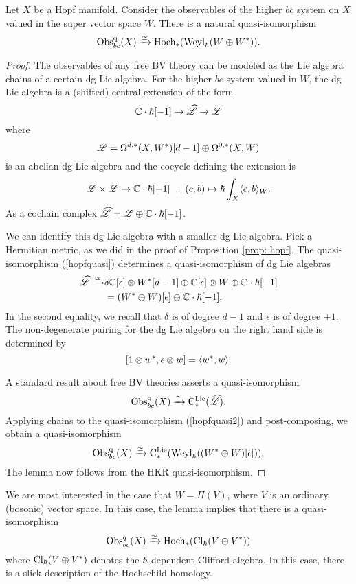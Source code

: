 \begin{lem}\label{lem: hopfcliff}
Let $X$ be a Hopf manifold. 
Consider the observables of the higher $bc$ system on $X$ valued in the super vector space $W$. 
There is a natural quasi-isomorphism
\[
{\rm Obs}^{\rm q}_{bc}(X) \xrightarrow{\simeq} {\rm Hoch}_*({\rm Weyl}_\hbar(W \oplus W^*)) .
\]
\end{lem}
\begin{proof}

The observables of any free BV theory can be modeled as the Lie algebra chains of a certain dg Lie algebra. 
For the higher $bc$ system valued in $W$, the dg Lie algebra is a (shifted) central extension of the form
\[
\mathbb C \cdot \hbar [-1] \to \widehat{\mathscr L} \to \mathscr L
\]
where
\[
\mathscr L = \Omega^{d,*}(X, W^*)[d-1] \oplus \Omega^{0,*}(X, W)
\]
is an abelian dg Lie algebra and the cocycle defining the extension is
\[
\mathscr L \times \mathscr L \to \mathbb C \cdot \hbar [-1] \;\; , \;\; (c, b) \mapsto \hbar \int_X \langle c, b\rangle_W .
\] 
As a cochain complex $\widehat{\mathscr L} = \mathscr L \oplus \mathbb C\cdot \hbar [-1]$. 

We can identify this dg Lie algebra with a smaller dg Lie algebra.
Pick a Hermitian metric, as we did in the proof of Proposition \ref{prop: hopf}.
The quasi-isomorphism (\ref{hopfquasi}) determines a quasi-isomorphism of dg Lie algebras
\begin{align}\label{hopfquasi2}
\widehat{\mathscr L} \xrightarrow{\simeq} & \delta \mathbb C[\epsilon] \otimes W^* [d-1] \oplus \mathbb C[\epsilon] \otimes W \oplus \mathbb C \cdot \hbar [-1] \\ & = (W^* \oplus W) [\epsilon] \oplus \mathbb C \cdot \hbar [-1] .
\end{align}
In the second equality, we recall that $\delta$ is of degree $d-1$ and $\epsilon$ is of degree $+1$.
The non-degenerate pairing for the dg Lie algebra on the right hand side is determined by
\[
[1 \otimes w^* , \epsilon \otimes w] = \langle w^*, w\rangle .
\]

A standard result about free BV theories asserts a quasi-isomorphism
\[
{\rm Obs}^{{\rm q}}_{bc} (X) \xrightarrow{\simeq} {\rm C}^{\rm Lie}_*(\widehat{\mathscr L}) .
\] 
Applying chains to the quasi-isomorphism (\ref{hopfquasi2}) and post-composing, we obtain a quasi-isomorphism
\[
{\rm Obs}^{\rm q}_{bc} (X) \xrightarrow{\simeq} {\rm C}^{\rm Lie}_*({\rm Weyl}_\hbar((W^* \oplus W) [\epsilon])) .
\] 
The lemma now follows from the HKR quasi-isomorphism. 
\end{proof}

We are most interested in the case that $W = \Pi(V)$, where $V$ is an ordinary (bosonic) vector space. 
In this case, the lemma implies that there is a quasi-isomorphism
\[
{\rm Obs}^q_{bc}(X) \xrightarrow{\simeq} {\rm Hoch}_*({\rm Cl}_\hbar(V \oplus V^*)) 
\]
where ${\rm Cl}_\hbar(V \oplus V^*)$ denotes the $\hbar$-dependent Clifford algebra. 
In this case, there is a slick description of the Hochschild homology. 

